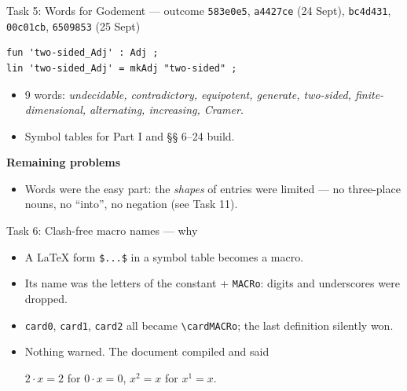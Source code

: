 \documentclass[10pt,aspectratio=169]{beamer}
\newcommand{\bad}[1]{\textcolor{warn}{#1}}
\newcommand{\commit}[1]{\texttt{\footnotesize #1}}
\begin{document}
\begin{frame}[fragile]{Task 5: Words for Godement --- outcome}
  \commit{583e0e5}, \commit{a4427ce} (24 Sept), \commit{bc4d431}, \commit{00c01cb},
  \commit{6509853} (25 Sept)
\begin{lstlisting}
fun 'two-sided_Adj' : Adj ;
lin 'two-sided_Adj' = mkAdj "two-sided" ;
\end{lstlisting}
  \begin{itemize}\small
    \item 9 words: \emph{undecidable, contradictory, equipotent, generate,
          two-sided, finite-dimensional, alternating, increasing, Cramer}.
    \item Symbol tables for Part I and §§ 6--24 build.
  \end{itemize}
  \textbf{Remaining problems}
  \begin{itemize}\small
    \item Words were the easy part: the \emph{shapes} of entries were limited
          --- no three-place nouns, no ``into'', no negation (see Task 11).
  \end{itemize}
\end{frame}

\begin{frame}{Task 6: Clash-free macro names --- why}
  \begin{itemize}
    \item A LaTeX form \texttt{\$...\$} in a symbol table becomes a macro.
    \item Its name was the letters of the constant + \texttt{MACRo}:
          digits and underscores were dropped.
    \item \texttt{card0}, \texttt{card1}, \texttt{card2} all became
          \texttt{\textbackslash cardMACRo}; the last definition silently won.
    \item Nothing warned. The document compiled and said
      \begin{center}
        \bad{$2 \cdot x = 2$} \quad for \quad $0 \cdot x = 0$, \qquad
        \bad{$x^2 = x$} \quad for \quad $x^1 = x$.
      \end{center}
  \end{itemize}
\end{frame}
\end{document}

